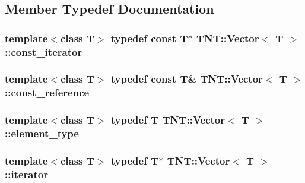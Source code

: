 \subsection{Member Typedef Documentation}
\hypertarget{classTNT_1_1Vector_a9a825ae9b3cb568a7b02449da6e9779f}{
\subsubsection[{const\-\_\-iterator}]{\setlength{\rightskip}{0pt plus 5cm}template$<$class T$>$ typedef const T$\ast$ {\bf T\-N\-T\-::\-Vector}$<$ T $>$\-::{\bf const\-\_\-iterator}}}\label{classTNT_1_1Vector_a9a825ae9b3cb568a7b02449da6e9779f}
\hypertarget{classTNT_1_1Vector_a2957faed9560f1f53bc5943a160d71bf}{
\subsubsection[{const\-\_\-reference}]{\setlength{\rightskip}{0pt plus 5cm}template$<$class T$>$ typedef const T\& {\bf T\-N\-T\-::\-Vector}$<$ T $>$\-::{\bf const\-\_\-reference}}}\label{classTNT_1_1Vector_a2957faed9560f1f53bc5943a160d71bf}
\hypertarget{classTNT_1_1Vector_af87934ec2406d242f6cc98035686bd1f}{
\subsubsection[{element\-\_\-type}]{\setlength{\rightskip}{0pt plus 5cm}template$<$class T$>$ typedef T {\bf T\-N\-T\-::\-Vector}$<$ T $>$\-::{\bf element\-\_\-type}}}\label{classTNT_1_1Vector_af87934ec2406d242f6cc98035686bd1f}
\hypertarget{classTNT_1_1Vector_a7289b2334c4c28181bb4193fa32fc48a}{
\subsubsection[{iterator}]{\setlength{\rightskip}{0pt plus 5cm}template$<$class T$>$ typedef T$\ast$ {\bf T\-N\-T\-::\-Vector}$<$ T $>$\-::{\bf iterator}}}\label{classTNT_1_1Vector_a7289b2334c4c28181bb4193fa32fc48a}
